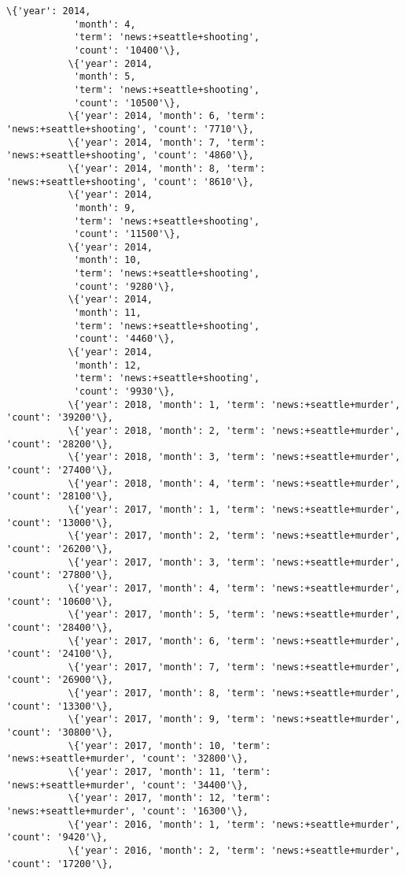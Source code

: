 \documentclass[11pt]{article}
\begin{document}
\begin{Verbatim}[commandchars=\\\{\}]
           \{'year': 2014,
            'month': 4,
            'term': 'news:+seattle+shooting',
            'count': '10400'\},
           \{'year': 2014,
            'month': 5,
            'term': 'news:+seattle+shooting',
            'count': '10500'\},
           \{'year': 2014, 'month': 6, 'term': 'news:+seattle+shooting', 'count': '7710'\},
           \{'year': 2014, 'month': 7, 'term': 'news:+seattle+shooting', 'count': '4860'\},
           \{'year': 2014, 'month': 8, 'term': 'news:+seattle+shooting', 'count': '8610'\},
           \{'year': 2014,
            'month': 9,
            'term': 'news:+seattle+shooting',
            'count': '11500'\},
           \{'year': 2014,
            'month': 10,
            'term': 'news:+seattle+shooting',
            'count': '9280'\},
           \{'year': 2014,
            'month': 11,
            'term': 'news:+seattle+shooting',
            'count': '4460'\},
           \{'year': 2014,
            'month': 12,
            'term': 'news:+seattle+shooting',
            'count': '9930'\},
           \{'year': 2018, 'month': 1, 'term': 'news:+seattle+murder', 'count': '39200'\},
           \{'year': 2018, 'month': 2, 'term': 'news:+seattle+murder', 'count': '28200'\},
           \{'year': 2018, 'month': 3, 'term': 'news:+seattle+murder', 'count': '27400'\},
           \{'year': 2018, 'month': 4, 'term': 'news:+seattle+murder', 'count': '28100'\},
           \{'year': 2017, 'month': 1, 'term': 'news:+seattle+murder', 'count': '13000'\},
           \{'year': 2017, 'month': 2, 'term': 'news:+seattle+murder', 'count': '26200'\},
           \{'year': 2017, 'month': 3, 'term': 'news:+seattle+murder', 'count': '27800'\},
           \{'year': 2017, 'month': 4, 'term': 'news:+seattle+murder', 'count': '10600'\},
           \{'year': 2017, 'month': 5, 'term': 'news:+seattle+murder', 'count': '28400'\},
           \{'year': 2017, 'month': 6, 'term': 'news:+seattle+murder', 'count': '24100'\},
           \{'year': 2017, 'month': 7, 'term': 'news:+seattle+murder', 'count': '26900'\},
           \{'year': 2017, 'month': 8, 'term': 'news:+seattle+murder', 'count': '13300'\},
           \{'year': 2017, 'month': 9, 'term': 'news:+seattle+murder', 'count': '30800'\},
           \{'year': 2017, 'month': 10, 'term': 'news:+seattle+murder', 'count': '32800'\},
           \{'year': 2017, 'month': 11, 'term': 'news:+seattle+murder', 'count': '34400'\},
           \{'year': 2017, 'month': 12, 'term': 'news:+seattle+murder', 'count': '16300'\},
           \{'year': 2016, 'month': 1, 'term': 'news:+seattle+murder', 'count': '9420'\},
           \{'year': 2016, 'month': 2, 'term': 'news:+seattle+murder', 'count': '17200'\},

\end{Verbatim}
\end{document}
